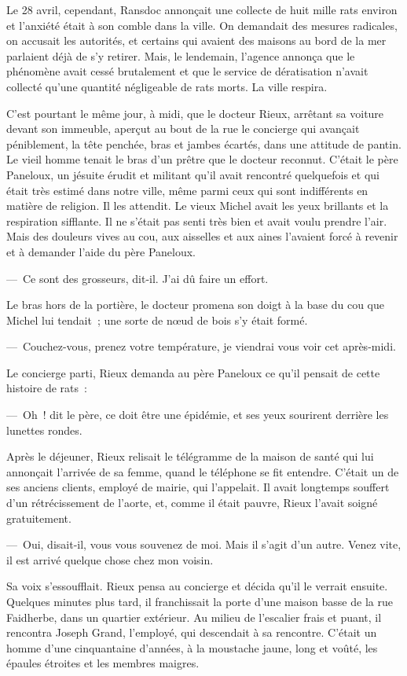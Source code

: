 \documentclass[french,twoside]{book} %
\begin{document}
Le 28 avril, cependant, Ransdoc annonçait une collecte de huit mille rats environ et l’anxiété était à son comble dans la ville. On demandait des mesures radicales, on accusait les autorités, et certains qui avaient des maisons au bord de la mer parlaient déjà de s’y retirer. Mais, le lendemain, l’agence annonça que le phénomène avait cessé brutalement et que le service de dératisation n’avait collecté qu’une quantité négligeable de rats morts. La ville respira.\par
C’est pourtant le même jour, à midi, que le docteur Rieux, arrêtant sa voiture devant son immeuble, aperçut au bout de la rue le concierge qui avançait péniblement, la tête penchée, bras et jambes écartés, dans une attitude de pantin. Le vieil homme tenait le bras d’un prêtre que le docteur reconnut. C’était le père Paneloux, un jésuite érudit et militant qu’il avait rencontré quelquefois et qui était très estimé dans notre ville, même parmi ceux qui sont indifférents en matière de religion. Il les attendit. Le vieux Michel avait les yeux brillants et la respiration sifflante. Il ne s’était pas senti très bien et avait voulu prendre l’air. Mais des douleurs vives au cou, aux aisselles et aux aines l’avaient forcé à revenir et à demander l’aide du père Paneloux.\par
— Ce sont des grosseurs, dit-il. J’ai dû faire un effort.\par
Le bras hors de la portière, le docteur promena son doigt à la base du cou que Michel lui tendait ; une sorte de nœud de bois s’y était formé.\par
— Couchez-vous, prenez votre température, je viendrai vous voir cet après-midi.\par
Le concierge parti, Rieux demanda au père Paneloux ce qu’il pensait de cette histoire de rats :\par
— Oh ! dit le père, ce doit être une épidémie, et ses yeux sourirent derrière les lunettes rondes.\par
Après le déjeuner, Rieux relisait le télégramme de la maison de santé qui lui annonçait l’arrivée de sa femme, quand le téléphone se fit entendre. C’était un de ses anciens clients, employé de mairie, qui l’appelait. Il avait longtemps souffert d’un rétrécissement de l’aorte, et, comme il était pauvre, Rieux l’avait soigné gratuitement.\par
— Oui, disait-il, vous vous souvenez de moi. Mais il s’agit d’un autre. Venez vite, il est arrivé quelque chose chez mon voisin.\par
Sa voix s’essoufflait. Rieux pensa au concierge et décida qu’il le verrait ensuite. Quelques minutes plus tard, il franchissait la porte d’une maison basse de la rue Faidherbe, dans un quartier extérieur. Au milieu de l’escalier frais et puant, il rencontra Joseph Grand, l’employé, qui descendait à sa rencontre. C’était un homme d’une cinquantaine d’années, à la moustache jaune, long et voûté, les épaules étroites et les membres maigres.\par
\end{document}
